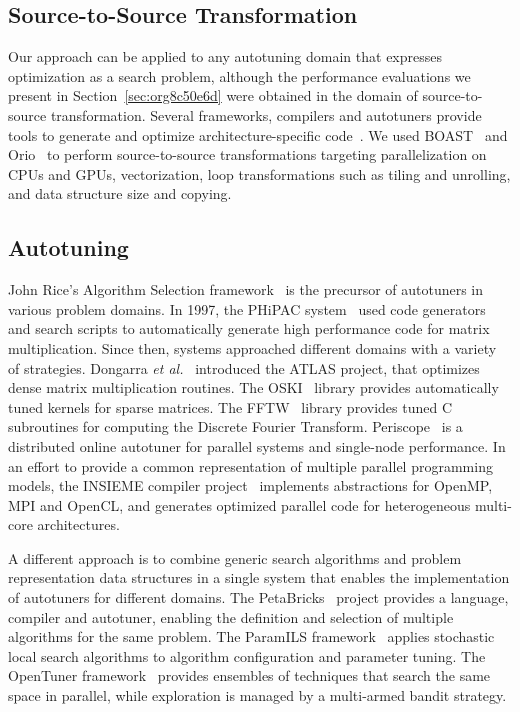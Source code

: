 \documentclass[conference]{IEEEtran}
\begin{document}
\subsection{Source-to-Source Transformation}
\label{sec:orge2f5acb}
Our approach can be applied to any autotuning domain that expresses optimization
as a search problem, although the performance evaluations we present in
Section~\ref{sec:org8c50e6d} were obtained in the domain of
source-to-source transformation. Several frameworks, compilers and autotuners
provide tools to generate and optimize architecture-specific
code~\cite{hartono2009annotation,videau2017boast,tiwari2009scalable,yi2007poet,ansel2009petabricks}.
We used BOAST~\cite{videau2017boast} and
Orio~\cite{hartono2009annotation} to perform source-to-source
transformations targeting parallelization on CPUs and GPUs, vectorization, loop
transformations such as tiling and unrolling, and data structure size and
copying.
\subsection{Autotuning}
\label{sec:org4e40c28}
John Rice's Algorithm Selection framework~\cite{rice1976algorithm} is the
precursor of autotuners in various problem domains. In 1997, the PHiPAC
system~\cite{bilmes1997optimizing} used code generators and search scripts
to automatically generate high performance code for matrix multiplication. Since
then, systems approached different domains with a variety of strategies.
Dongarra \emph{et al.}~\cite{dongarra1998automatically} introduced the ATLAS
project, that optimizes dense matrix multiplication routines. The
OSKI~\cite{vuduc2005oski} library provides automatically tuned kernels for
sparse matrices. The FFTW~\cite{frigo1998fftw} library provides tuned C
subroutines for computing the Discrete Fourier Transform.
Periscope~\cite{gerndt2010automatic} is a distributed online autotuner for
parallel systems and single-node performance. In an effort to provide a common
representation of multiple parallel programming models, the INSIEME compiler
project~\cite{jordan2012multi} implements abstractions for OpenMP, MPI and
OpenCL, and generates optimized parallel code for heterogeneous multi-core
architectures.

A different approach is to combine generic search algorithms and problem
representation data structures in a single system that enables the
implementation of autotuners for different domains. The
PetaBricks~\cite{ansel2009petabricks} project provides a language,
compiler and autotuner, enabling the definition and selection of multiple
algorithms for the same problem. The ParamILS
framework~\cite{hutter2009paramils} applies stochastic local search
algorithms to algorithm configuration and parameter tuning. The OpenTuner
framework~\cite{ansel2014opentuner} provides ensembles of techniques that
search the same space in parallel, while exploration is managed by a multi-armed
bandit strategy.
\end{document}
